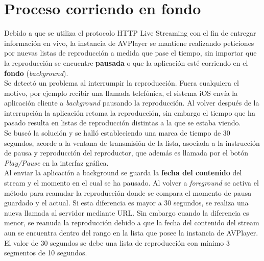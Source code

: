 
\section{Proceso corriendo en fondo} %

Debido a que se utiliza el protocolo HTTP Live Streaming con el fin de entregar información en vivo, la instancia de AVPlayer se mantiene realizando peticiones por nuevas listas de reproducción a medida que pase el tiempo, sin importar que la reproducción se encuentre \textbf{pausada} o que la aplicación esté corriendo en el \textbf{fondo} (\textit{background}).\\

Se detectó un problema al interrumpir la reproducción. Fuera cualquiera el motivo, por ejemplo recibir una llamada telefónica, el sistema iOS envía la aplicación cliente a \textit{background} pausando la reproducción. Al volver después de la interrupción la aplicación retoma la reproducción, sin embargo el tiempo que ha pasado resulta en listas de reproducción distintas a la que se estaba viendo.\\

Se buscó la solución y se halló estableciendo una marca de tiempo de 30 segundos, acorde a la ventana de transmisión de la lista, asociada a la instrucción de pausa y reproducción del reproductor, que además es llamada por el botón \textit{Play/Pause} en la interfaz gráfica.\\

Al enviar la aplicación a background se guarda la \textbf{fecha del contenido} del stream y el momento en el cual se ha pausado.
Al volver a \textit{foreground} se activa el método para reanudar la reproducción donde se compara el momento de pausa guardado y el actual. Si esta diferencia es mayor a 30 segundos, se realiza una nueva llamada al servidor mediante URL. Sin embargo cuando la diferencia es menor, se reanuda la reproducción debido a que la fecha del contenido del stream aun se encuentra dentro del rango en la lista que posee la instancia de AVPlayer.\\

El valor de 30 segundos se debe una lista de reproducción con mínimo 3 segmentos de 10 segundos.\\

